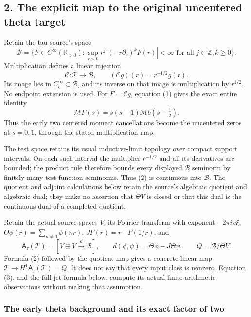 \subsection{2. The explicit map to the original uncentered theta
target}\label{proof09:the-explicit-map-to-the-original-uncentered-theta-target}

Retain the tau source's space \[
\mathscr B=\{F\in C^\infty(\mathbb R_{>0}):\sup_{r>0}r^j|(-r\partial_r)^kF(r)|<\infty\text{ for all }j\in\mathbb Z,k\ge0\}.
\] Multiplication defines a linear injection \[
\mathcal C:\mathscr T\longrightarrow\mathscr B,\qquad (\mathcal Cg)(r)=r^{-1/2}g(r).
\tag{2}
\] Its image lies in \(C_c^\infty\subset\mathscr B\), and its inverse on
that image is multiplication by \(r^{1/2}\). No endpoint extension is
used. For \(F=\mathcal Cg\), equation (1) gives the exact entire
identity \[
\boxed{\mathcal MF(s)=s(s-1)\mathcal Mb(s-\tfrac12).}
\tag{3}
\] Thus the early two centered moment cancellations become the
uncentered zeros at \(s=0,1\), through the stated multiplication map.

The test space retains its usual inductive-limit topology over compact
support intervals. On each such interval the multiplier \(r^{-1/2}\) and
all its derivatives are bounded; the product rule therefore bounds every
displayed \(\mathscr B\) seminorm by finitely many test-function
seminorms. Thus (2) is continuous into \(\mathscr B\). The quotient and
adjoint calculations below retain the source's algebraic quotient and
algebraic dual; they make no assertion that \(\Theta V\) is closed or
that this dual is the continuous dual of a completed quotient.

Retain the actual source spaces \(V\), its Fourier transform with
exponent \(-2\pi i x\xi\), \(\Theta\phi(r)=\sum_{n\ne0}\phi(nr)\),
\(JF(r)=r^{-1}F(1/r)\), and \[
\mathsf A_\tau(\mathcal T)=[V\oplus V\xrightarrow{d}\mathscr B],\qquad
d(\phi,\psi)=\Theta\phi-J\Theta\psi,
\qquad Q=\mathscr B/\Theta V.
\] Formula (2) followed by the quotient map gives a concrete linear map
\(\mathscr T\to H^1\mathsf A_\tau(\mathcal T)=Q\). It does not say that
every input class is nonzero. Equation (3), and the full jet formula
below, compute its actual finite arithmetic observations without making
that assumption.

\subsubsection{The early theta background and its exact factor of
two}\label{proof09:the-early-theta-background-and-its-exact-factor-of-two}

